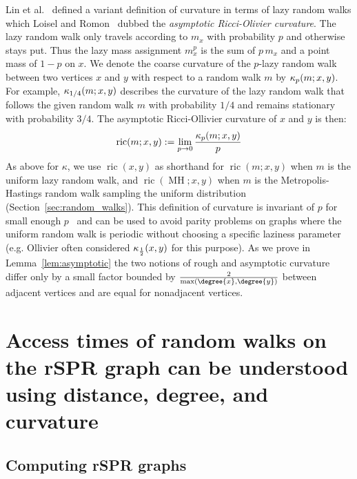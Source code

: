 \documentclass[11pt,onecolumn,conference]{IEEEtran}
\newcommand{\MH}{\operatorname{MH}}
\newcommand{\curvature}[2][]{%
    \ifthenelse{\equal{#1}{}}%
		{\kappa(#2)}%
		{\kappa_{#1}(#2)}%
}
\newcommand{\ric}[1]{
	\operatorname{ric}(#1)%
}
\begin{document}
Lin et al.~\cite{lin2011ricci} defined a variant definition of curvature in terms of lazy random walks which Loisel and Romon~\cite{Loisel2014-hu} dubbed the \emph{asymptotic Ricci-Olivier curvature}.
The lazy random walk only travels according to $m_x$ with probability $p$ and otherwise stays put.
Thus the lazy mass assignment $m^p_x$ is the sum of $p\, m_x$ and a point mass of $1 - p$ on $x$.
We denote the coarse curvature of the $p$-lazy random walk between two vertices $x$ and $y$ with respect to a random walk $m$ by $\curvature[p]{m; x,y}$.
For example, $\curvature[1/4]{m; x,y}$ describes the curvature of the lazy random walk that follows the given random walk $m$ with probability $1/4$ and remains stationary with probability $3/4$.
The asymptotic Ricci-Ollivier curvature of $x$ and $y$ is then:
\begin{equation}
\ric{m; x, y} := \lim_{p \rightarrow 0} \frac{\curvature[p]{m; x,y}}{p}
\label{eq:asympCurvatureDef}
\end{equation}
As above for $\kappa$, we use $\ric{x, y}$ as shorthand for $\ric{m; x, y}$ when $m$ is the uniform lazy random walk, and $\ric{\MH; x, y}$ when $m$ is the Metropolis-Hastings random walk sampling the uniform distribution (Section~\ref{sec:random_walks}).
This definition of curvature is invariant of $p$ for small enough $p$~\cite{Loisel2014-hu} and can be used to avoid parity problems on graphs where the uniform random walk is periodic without choosing a specific laziness parameter (e.g. Ollivier often considered $\curvature[\frac{1}{2}]{x,y}$ for this purpose).
As we prove in Lemma~\ref{lem:asymptotic} the two notions of rough and asymptotic curvature differ only by a small factor bounded by $\frac{2}{\max(\degree{x}, \degree{y})}$ between adjacent vertices and are equal for nonadjacent vertices.


\section{Access times of random walks on the rSPR graph can be understood using distance, degree, and curvature}

\subsection{Computing rSPR graphs}
\label{sec:computing_treespace}
\end{document}
